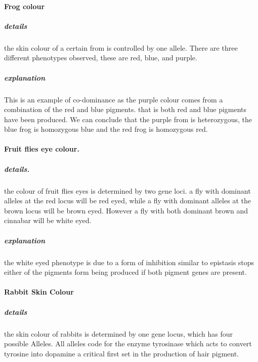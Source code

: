 \documentclass[]{article}
\let\oldparagraph\paragraph
\renewcommand{\paragraph}[1]{\oldparagraph{#1}\mbox{}}
\let\oldsubparagraph\subparagraph
\renewcommand{\subparagraph}[1]{\oldsubparagraph{#1}\mbox{}}
\begin{document}
\hypertarget{frog-colour}{%
\paragraph{Frog colour}\label{frog-colour}}

\hypertarget{details}{%
\subparagraph{details}\label{details}}

the skin colour of a certain from is controlled by one allele. There are
three different phenotypes observed, these are red, blue, and purple.

\hypertarget{explanation}{%
\subparagraph{explanation}\label{explanation}}

This is an example of co-dominance as the purple colour comes from a
combination of the red and blue pigments. that is both red and blue
pigments have been produced. We can conclude that the purple from is
heterozygous, the blue frog is homozygous blue and the red frog is
homozygous red.

\hypertarget{fruit-flies-eye-colour.}{%
\paragraph{Fruit flies eye colour.}\label{fruit-flies-eye-colour.}}

\hypertarget{details.}{%
\subparagraph{details.}\label{details.}}

the colour of fruit flies eyes is determined by two gene loci. a fly
with dominant alleles at the red locus will be red eyed, while a fly
with dominant alleles at the brown locus will be brown eyed. However a
fly with both dominant brown and cinnabar will be white eyed.

\hypertarget{explanation-1}{%
\subparagraph{explanation}\label{explanation-1}}

the white eyed phenotype is due to a form of inhibition similar to
epistasis stops either of the pigments form being produced if both
pigment genes are present.

\hypertarget{rabbit-skin-colour}{%
\paragraph{Rabbit Skin Colour}\label{rabbit-skin-colour}}

\hypertarget{details-1}{%
\subparagraph{details}\label{details-1}}

the skin colour of rabbits is determined by one gene locus, which has
four possible Alleles. All alleles code for the enzyme tyrosinase which
acts to convert tyrosine into dopamine a critical first set in the
production of hair pigment.
\end{document}
